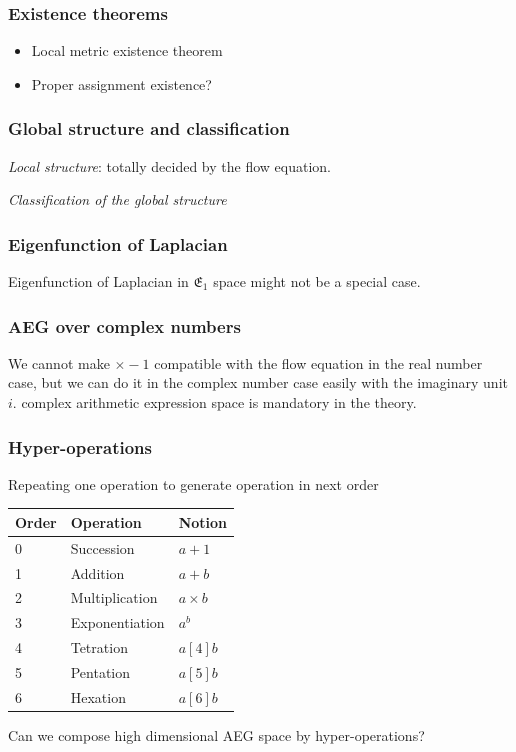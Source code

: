 \documentclass[aspectratio=169]{beamer}
\begin{document}
\begin{frame}
\begin{columns}
\begin{column}{0.5\textwidth}
\begin{figure}[ht]
            \end{figure}
        \end{column}
    \end{columns}

\end{frame}

\begin{frame}
    \frametitle{Existence theorems}
    \begin{itemize}
        \item Local metric existence theorem
        \item Proper assignment existence?
    \end{itemize}
\end{frame}

\begin{frame}
    \frametitle{Global structure and classification}

    \emph{Local structure}: totally decided by the flow equation.

    \emph{Classification of the global structure}

\end{frame}

\begin{frame}
\frametitle{Eigenfunction of Laplacian}
    Eigenfunction of Laplacian in $\mathfrak{E_1}$ space might not be a special case.
\end{frame}

\begin{frame}
    \frametitle{AEG over complex numbers}
    We cannot make $\times -1$ compatible with the flow equation in the real number case,
    but we can do it in the complex number case easily with the imaginary unit $i$.
    complex arithmetic expression space is mandatory in the theory.
\end{frame}

\begin{frame}
    \frametitle{Hyper-operations}
    Repeating one operation to generate operation in next order
    \begin{table}[!ht]
        \centering
        \begin{tabular}{|l|l|l|}
            \hline
            Order & Operation &  Notion \\
            \hline
            0 & Succession & $a + 1$ \\
            1 & Addition & $a + b$ \\
            2 & Multiplication & $a \times b$ \\
            3 & Exponentiation & $a^b$ \\
            4 & Tetration & $a [4] b$ \\
            5 & Pentation & $a [5] b$ \\
            6 & Hexation & $a [6] b$ \\
            \hline
       \end{tabular}\label{tab:table}
    \end{table}
    Can we compose high dimensional AEG space by hyper-operations?
\end{frame}
\end{document}
